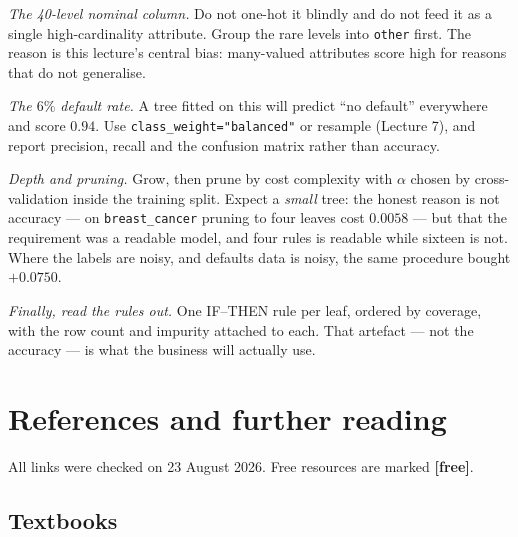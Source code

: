 \documentclass[11pt]{article}
\begin{document}
\emph{The 40-level nominal column.} Do not one-hot it blindly and do not feed
it as a single high-cardinality attribute. Group the rare levels into
\texttt{other} first. The reason is this lecture's central bias: many-valued
attributes score high for reasons that do not generalise.

\emph{The $6\%$ default rate.} A tree fitted on this will predict ``no
default'' everywhere and score $0.94$. Use
\texttt{class\_weight="balanced"} or resample (Lecture 7), and report
precision, recall and the confusion matrix rather than accuracy.

\emph{Depth and pruning.} Grow, then prune by cost complexity with $\alpha$
chosen by cross-validation inside the training split. Expect a
\emph{small} tree: the honest reason is not accuracy --- on
\texttt{breast\_cancer} pruning to four leaves cost $0.0058$ --- but that the
requirement was a readable model, and four rules is readable while sixteen is
not. Where the labels are noisy, and defaults data is noisy, the same
procedure bought $+0.0750$.

\emph{Finally, read the rules out.} One IF--THEN rule per leaf, ordered by
coverage, with the row count and impurity attached to each. That artefact ---
not the accuracy --- is what the business will actually use.

\section{References and further reading}

All links were checked on 23 August 2026. Free resources are marked
\textbf{[free]}.

\subsection*{Textbooks}
\end{document}
